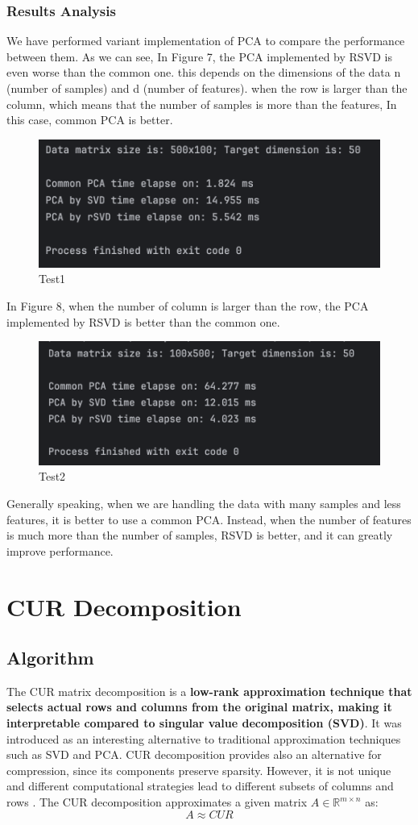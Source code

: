 \documentclass[11pt,a4paper]{article}
\begin{document}
\subsubsection{Results Analysis}
We have performed variant implementation of PCA to compare the performance between them. 
As we can see, In Figure 7, the PCA implemented by RSVD is even worse than the common one.
this depends on the dimensions of the data n (number of samples) and d (number of features).  when the row is larger than the column, which means that the number of samples is more than the features, In this case, common PCA is better.
\begin{figure}[H]
    \centering
    \includegraphics[width=0.5\linewidth]{Images/PCAtest/SCR-20250131-npyn.png}
    \caption{Test1}
    \label{fig:PCATest1}
\end{figure}
In Figure 8, when the number of column is larger than the row, the PCA implemented by RSVD is better than the common one. 
\begin{figure}[H]
    \centering
    \includegraphics[width=0.5\linewidth]{Images/PCAtest/SCR-20250131-nqck.png}
    \caption{Test2}
    \label{fig:PCATest2}
\end{figure}
Generally speaking, when we are handling the data with many samples and less features, it is better to use a common PCA. Instead, when the number of features is much more than the number of samples, RSVD is better, and it can greatly improve performance.
\section{CUR Decomposition}
\subsection{Algorithm}
The CUR matrix decomposition is a \textbf{low-rank approximation technique that selects actual rows and columns from the original matrix, making it interpretable compared to singular value decomposition (SVD)}. It was introduced as an interesting alternative to traditional approximation techniques such as SVD and PCA. CUR decomposition provides also an alternative for compression, since its components preserve sparsity. However, it is not unique and different computational strategies lead to different subsets of columns and rows \cite{Erichson_2019}.
The CUR decomposition approximates a given matrix $ A \in \mathbb{R}^{m \times n} $ as:
\[
A \approx CUR
\]
\end{document}
